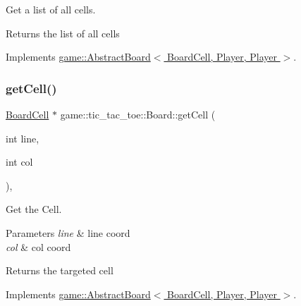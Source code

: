 Get a list of all cells. 

\begin{DoxyReturn}{Returns}
the list of all cells 
\end{DoxyReturn}


Implements \hyperlink{classgame_1_1_abstract_board_a73d6bef66826688cd6e2bc0f37acb4b0}{game\+::\+Abstract\+Board$<$ Board\+Cell, Player, Player $>$}.

\mbox{\label{classgame_1_1tic__tac__toe_1_1_board_ab5c00479b4dabd60bef9ea00fce23779}} 
\subsubsection{\texorpdfstring{get\+Cell()}{getCell()}}
{\footnotesize\ttfamily \hyperlink{classgame_1_1tic__tac__toe_1_1_board_cell}{Board\+Cell} $\ast$ game\+::tic\+\_\+tac\+\_\+toe\+::\+Board\+::get\+Cell (\begin{DoxyParamCaption}\item[{int}]{line,  }\item[{int}]{col }\end{DoxyParamCaption})\hspace{0.3cm}{\ttfamily [override]}, {\ttfamily [virtual]}}



Get the Cell. 


\begin{DoxyParams}{Parameters}
{\em line} & line coord \\
\hline
{\em col} & col coord \\
\hline
\end{DoxyParams}
\begin{DoxyReturn}{Returns}
the targeted cell 
\end{DoxyReturn}


Implements \hyperlink{classgame_1_1_abstract_board_af02030d0ae3f44b95fff7c8012e7a066}{game\+::\+Abstract\+Board$<$ Board\+Cell, Player, Player $>$}.

